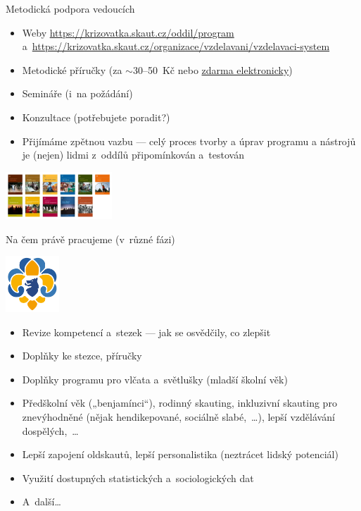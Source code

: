 \documentclass[compress, ucs, xelatex, xcolor=dvipsnames, print,
  hyperref={
    bookmarks=true,
    unicode=true,
    colorlinks=true,
    plainpages=false,
    pdfkeywords={Junak, Pedagogika, Skaut, Skauting, Vychovna metoda},
    linkcolor=Black,
    anchorcolor=Black,
    citecolor=OliveGreen,
    filecolor=OliveGreen,
    menucolor=Black,
    urlcolor=OliveGreen,
    pdftex}
  ]{beamer}
\begin{document}
\begin{frame}{Metodická podpora vedoucích}
  \begin{itemize}
    \item Weby \url{https://krizovatka.skaut.cz/oddil/program} a~\url{https://krizovatka.skaut.cz/organizace/vzdelavani/vzdelavaci-system}
    \item Metodické příručky (za $\sim$30--50~Kč nebo \href{https://www.obchod.skaut.cz/index.php?tpl=&_artperpage=99&cl=alist&searchparam=&cnid=701}{zdarma elektronicky})
    \item Semináře (i~na  požádání)
    \item Konzultace (potřebujete poradit?)
    \item Přijímáme zpětnou vazbu --- celý proces tvorby a úprav programu a nástrojů je (nejen) lidmi z~oddílů připomínkován a~testován
  \end{itemize}
  \begin{center}
    \includegraphics[width=4cm]{prirucky.png}
  \end{center}
\end{frame}

\begin{frame}{Na čem právě pracujeme (v~různé fázi)}
  \begin{center}
    \includegraphics[width=2cm]{lilie.png}
  \end{center}
  \begin{itemize}
    \item Revize kompetencí a~stezek --- jak se osvědčily, co zlepšit
    \item Doplňky ke stezce, příručky
    \item Doplňky programu pro vlčata a~světlušky (mladší školní věk)
    \item Předškolní věk („benjamínci“), rodinný skauting, inkluzivní skauting pro znevýhodněné (nějak hendikepované, sociálně slabé,~\ldots), lepší vzdělávání dospělých,~\ldots
    \item Lepší zapojení oldskautů, lepší personalistika (neztrácet lidský potenciál)
    \item Využití dostupných statistických a~sociologických dat
    \item A~další\ldots
  \end{itemize}
\end{frame}
\end{document}
